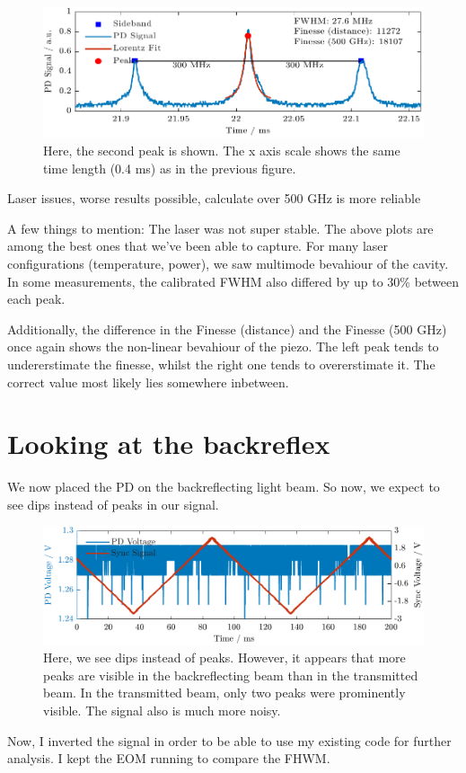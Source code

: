 \documentclass[a4paper,11pt]{article}
\begin{document}
\begin{figure}[H]
    \centering
    \includegraphics[width=\textwidth]{EOM/Peak1.pdf}
    \caption{Here, the second peak is shown. The x axis scale shows the same time length (0.4 ms) as in the previous figure.}
\end{figure}


Laser issues, worse results possible, calculate over 500 GHz is more reliable

A few things to mention: The laser was not super stable. The above plots are among the best ones that we've been able to capture. For many laser configurations (temperature, power), we saw multimode bevahiour of the cavity.
In some measurements, the calibrated FWHM also differed by up to 30\% between each peak.

Additionally, the difference in the Finesse (distance) and the Finesse (500 GHz) once again shows the non-linear bevahiour of the piezo.
The left peak tends to undererstimate the finesse, whilst the right one tends to overerstimate it. The correct value most likely lies somewhere inbetween.



\newpage
\section{Looking at the backreflex}
We now placed the PD on the backreflecting light beam. So now, we expect to see dips instead of peaks in our signal.


\begin{figure}[htbp]
    \centering
    \includegraphics[width=\textwidth]{back/Figure_1.pdf}
    \caption{Here, we see dips instead of peaks. However, it appears that more peaks are visible in the backreflecting beam than in the transmitted beam. In the transmitted beam, only two peaks were prominently visible. The signal also is much more noisy.}
\end{figure}
Now, I inverted the signal in order to be able to use my existing code for further analysis. I kept the EOM running to compare the FHWM.
\end{document}
